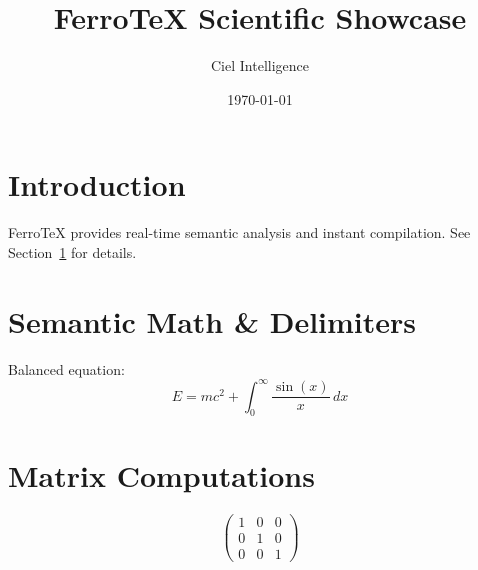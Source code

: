 \documentclass{article}
\title{FerroTeX Scientific Showcase}
\author{Ciel Intelligence}
\date{\today}
\begin{document}
\maketitle

\section{Introduction}\label{sec:intro}
FerroTeX provides real-time semantic analysis and instant compilation.
See Section~\ref{sec:intro} for details.

\section{Semantic Math \& Delimiters}
Balanced equation:
\begin{equation}
E = mc^2 + \int_{0}^{\infty} \frac{\sin(x)}{x} \, dx
\end{equation}

\section{Matrix Computations}
\[
\begin{pmatrix}
1 & 0 & 0 \\
0 & 1 & 0 \\
0 & 0 & 1
\end{pmatrix}
\]
\end{document}
